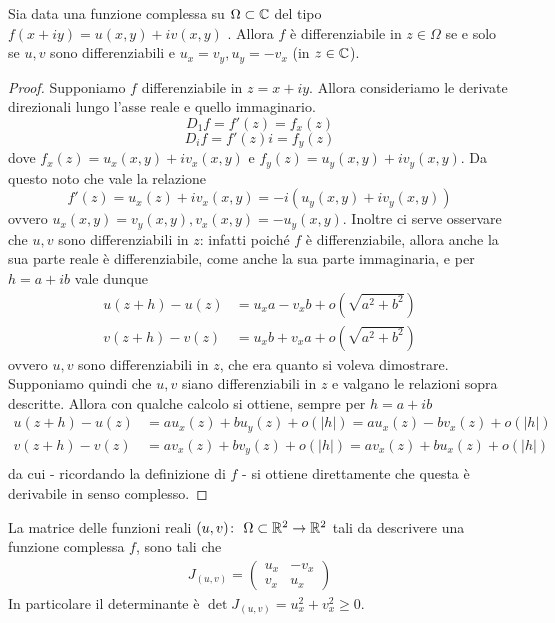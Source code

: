 \begin{theorem}
	Sia data una funzione complessa su $\Omega \subset \mathbb{C}$ del tipo $f(x+iy) = u(x,y) + iv(x,y)$ . Allora $f$ è differenziabile in $z \in \Omega$ se e solo se $u,v$ sono differenziabili e $u_x = v_y, u_y = - v_x$ (in $z \in \mathbb{C}$).
\end{theorem}
\begin{proof}
	Supponiamo $f$ differenziabile in $z=x+iy$. Allora consideriamo le derivate direzionali lungo l'asse reale e quello immaginario.
		$$D_{1} f  = f'(z) = f_x(z) $$
		$$D_{i} f  = f'(z)i = f_y(z)$$
	dove $f_x(z) = u_x(x,y) + iv_x(x,y)$ e $f_y(z) = u_y(x,y) + iv_y(x,y)$. Da questo noto che vale la relazione
	\begin{equation*}
		f'(z) = u_x(z) + iv_x(x,y) = -i(u_y(x,y) + iv_y(x,y))
	\end{equation*}	
	ovvero $u_x(x,y) = v_y(x,y), v_x(x,y) = -u_y(x,y)$. Inoltre ci serve osservare che $u,v$ sono differenziabili in $z$: infatti poiché $f$ è differenziabile, allora anche la sua parte reale è differenziabile, come anche la sua parte immaginaria, e per $h = a + ib$ vale dunque 
	\begin{equation*}
	\begin{aligned}
		u(z+h) - u(z) & = u_x a - v_x b + o(\sqrt{a^2 + b^2})\\
		v(z+h) - v(z) & = u_x b + v_x a + o(\sqrt{a^2 + b^2})
	\end{aligned}
	\end{equation*}
	ovvero $u,v$ sono differenziabili in $z$, che era quanto si voleva dimostrare. 
	Supponiamo quindi che $u,v$ siano differenziabili in $z$ e valgano le relazioni sopra descritte. Allora con qualche calcolo si ottiene, sempre per $h = a + ib$
	\begin{equation*}
	\begin{aligned}
		u(z+h) - u(z) & = a u_x(z) + b u_y(z) + o(|h|) = a u_x(z) - b v_x(z) + o(|h|) \\
		v(z+h) - v(z) & = a v_x(z) + b v_y(z) + o(|h|) = a v_x(z) + b u_x(z) + o(|h|) \\
		\end{aligned}
	\end{equation*}
	da cui - ricordando la definizione di $f$ - si ottiene direttamente che questa è derivabile in senso complesso.
\end{proof}

\begin{corollary}
	La matrice delle funzioni reali $(u,v) \colon\ \Omega \subset \mathbb{R}^2 \rightarrow \mathbb{R}^2$ tali da descrivere una funzione complessa $f$, sono tali che  
	\begin{equation*}
	\begin{aligned}
		J_{(u,v)} = \left( \begin{array}{cc}
					u_x & - v_x\\ v_x & u_x
					\end{array} \right)
	\end{aligned}
	\end{equation*}
	In particolare il determinante è $\det J_{(u,v)} = u^2_x + v^2_x \ge 0$.
\end{corollary}

